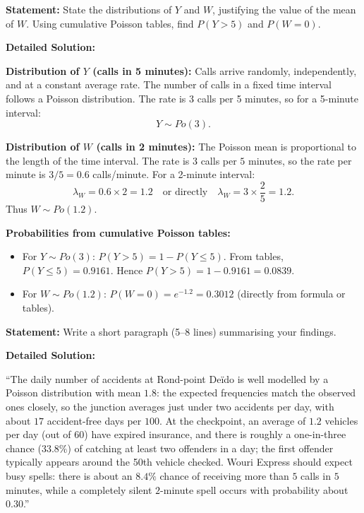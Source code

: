 \documentclass[11pt]{article}
\begin{document}
\begin{exoresolu}
\textbf{Statement:} State the distributions of $Y$ and $W$, justifying the value of the mean of $W$. Using cumulative Poisson tables, find $P(Y > 5)$ and $P(W = 0)$.

\tcblower
\textbf{Detailed Solution:}

\textbf{Distribution of $Y$ (calls in 5 minutes):}
Calls arrive randomly, independently, and at a constant average rate. The number of calls in a fixed time interval follows a Poisson distribution. The rate is 3 calls per 5 minutes, so for a 5-minute interval:
\[
Y \sim Po(3).
\]

\textbf{Distribution of $W$ (calls in 2 minutes):}
The Poisson mean is proportional to the length of the time interval. The rate is $3$ calls per $5$ minutes, so the rate per minute is $3/5 = 0.6$ calls/minute. For a 2-minute interval:
\[
\lambda_W = 0.6 \times 2 = 1.2 \quad \text{or directly} \quad \lambda_W = 3 \times \frac{2}{5} = 1.2.
\]
Thus $W \sim Po(1.2)$.

\textbf{Probabilities from cumulative Poisson tables:}
\begin{itemize}
\item For $Y \sim Po(3)$: $P(Y > 5) = 1 - P(Y \leq 5)$. From tables, $P(Y \leq 5) = 0.9161$. Hence $P(Y > 5) = 1 - 0.9161 = 0.0839$.
\item For $W \sim Po(1.2)$: $P(W = 0) = e^{-1.2} = 0.3012$ (directly from formula or tables).
\end{itemize}
\end{exoresolu}

\begin{exoresolu}
\textbf{Statement:} Write a short paragraph (5--8 lines) summarising your findings.

\tcblower
\textbf{Detailed Solution:}

``The daily number of accidents at Rond-point Deïdo is well modelled by a Poisson distribution with mean $1.8$: the expected frequencies match the observed ones closely, so the junction averages just under two accidents per day, with about $17$ accident-free days per $100$. At the checkpoint, an average of $1.2$ vehicles per day (out of $60$) have expired insurance, and there is roughly a one-in-three chance ($33.8\%$) of catching at least two offenders in a day; the first offender typically appears around the 50th vehicle checked. Wouri Express should expect busy spells: there is about an $8.4\%$ chance of receiving more than $5$ calls in $5$ minutes, while a completely silent $2$-minute spell occurs with probability about $0.30$.''
\end{exoresolu}
\end{document}
